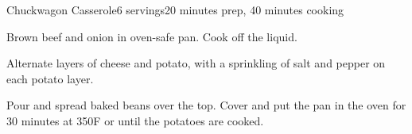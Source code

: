 \documentclass[../Cookbook.tex]{subfiles}
\begin{document}
\begin{recipe}{Chuckwagon Casserole}{6 servings}{20 minutes prep, 40 minutes cooking}


Brown beef and onion in oven-safe pan. Cook off the liquid.

Alternate layers of cheese and potato, with a sprinkling of salt and pepper on each potato layer.

Pour and spread baked beans over the top. Cover and put the pan in the oven for 30 minutes at 350\0F or until the potatoes are cooked.

\end{recipe}
\end{document}
